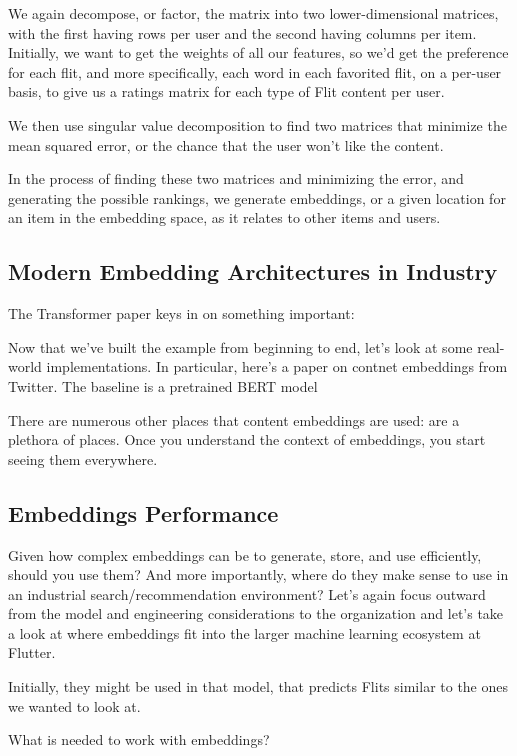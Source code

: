 \documentclass[draft, 11pt]{diazessay} %
\begin{document}
We again decompose, or factor, the matrix into two lower-dimensional matrices, with the first having rows per user and the second having columns per item. Initially, we want to get the weights of all our features, so we’d get the preference for each flit, and more specifically, each word in each favorited flit, on a per-user basis, to give us a ratings matrix for each type of Flit content per user. 

We then use singular value decomposition to find two matrices that minimize the mean squared error, or the chance that the user won’t like the content. 

In the process of finding these two matrices and minimizing the error, and generating the possible rankings, we generate embeddings, or a given location for an item in the embedding space, as it relates to other items and users. 

\subsection{Modern Embedding Architectures in Industry}

The Transformer paper keys in on something important: 

Now that we've built the example from beginning to end, let's look at some real-world implementations. In particular, here's a paper on contnet embeddings from Twitter. The baseline is a pretrained BERT model 

There are numerous other places that content embeddings are used: are a plethora of places. Once you understand the context of embeddings, you start seeing them everywhere.  


\subsection{Embeddings Performance}

Given how complex embeddings can be to generate, store, and use efficiently, should you use them? And more importantly, where do they make sense to use in an industrial search/recommendation environment? Let’s again focus outward from the model and engineering considerations to the organization and let's take a look at where embeddings fit into the larger machine learning ecosystem at Flutter. 

Initially, they might be used in that model, that predicts Flits similar to the ones we wanted to look at.  

What is needed to work with embeddings? 
\end{document}
